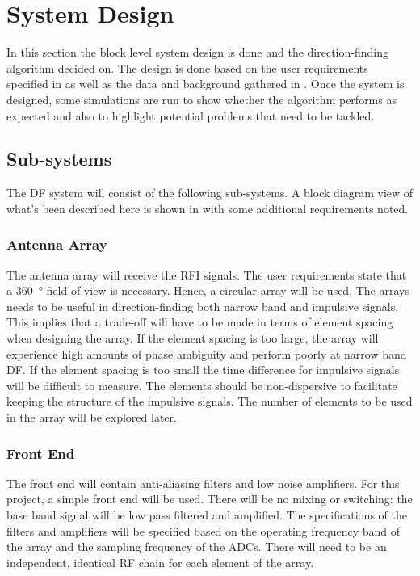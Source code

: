 \chapter{System Design}
\label{ch:system-design}
\graphicspath{{./img/system-design/}}

In this section the block level system design is done and the direction-finding algorithm decided on.
The design is done based on the user requirements specified in  as well as the data and background gathered in .
Once the system is designed, some simulations are run to show whether the algorithm performs as expected and also to highlight potential problems that need to be tackled.

\section{Sub-systems}
The DF system will consist of the following sub-systems.
A block diagram view of what's been described here is shown in  with some additional requirements noted.

\subsection{Antenna Array}
The antenna array will receive the RFI signals. The user requirements state that a \SI{360}{\degree} field of view is necessary. Hence, a circular array will be used. The arrays needs to be useful in direction-finding both narrow band and impulsive signals. This implies that a trade-off will have to be made in terms of element spacing when designing the array. If the element spacing is too large, the array will experience high amounts of phase ambiguity and perform poorly at narrow band DF. If the element spacing is too small the time difference for impulsive signals will be difficult to measure. The elements should be non-dispersive to facilitate keeping the structure of the impulsive signals. The number of elements to be used in the array will be explored later.

\subsection{Front End}
The front end will contain anti-aliasing filters and low noise amplifiers. For this project, a simple front end will be used. There will be no mixing or switching: the base band signal will be low pass filtered and amplified. The specifications of the filters and amplifiers will be specified based on the operating frequency band of the array and the sampling frequency of the ADCs. There will need to be an independent, identical RF chain for each element of the array.

